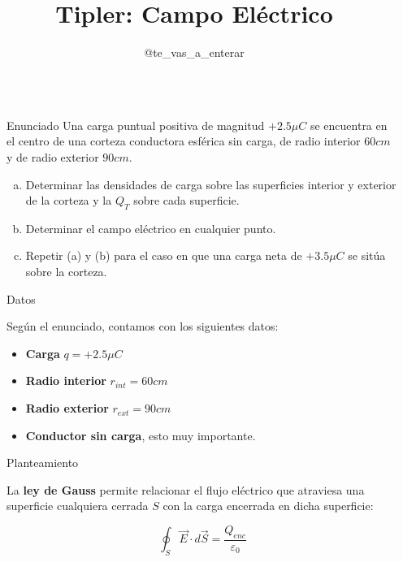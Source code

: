 \documentclass[final]{beamer}
\title{Tipler: Campo Eléctrico}
\author{@te\_vas\_a\_enterar}
\institute[shortinst]{Alberto de Santos}
\newlength{\sepwidth}
\newlength{\colwidth}
\newcommand{\separatorcolumn}{\begin{column}{\sepwidth}\end{column}}
\begin{document}
\begin{frame}[t]
\begin{columns}[t]
\separatorcolumn

\begin{column}{\colwidth}

  \begin{block}{Enunciado}
    Una carga puntual positiva de magnitud $+2.5 \mu C$ se encuentra en el centro de una corteza conductora esférica sin carga, 
        de radio interior $60cm$ y de radio exterior $90cm$.
    \begin{enumerate}[(a)]
        \item Determinar las densidades de carga sobre las superficies interior y exterior de la corteza y la $Q_T$ sobre cada superficie.
        \item Determinar el campo eléctrico en cualquier punto.
        \item Repetir (a) y (b) para el caso en que una carga neta de $+3.5 \mu C$ se sitúa sobre la corteza.
    \end{enumerate}

  \end{block}

  \begin{block}{Datos}

    Según el enunciado, contamos con los siguientes datos:

    \begin{itemize}
      \item \textbf{Carga} $q = +2.5 \mu C$
      \item \textbf{Radio interior} $r_{int} = 60cm$
      \item \textbf{Radio exterior} $r_{ext} = 90cm$
      \item \textbf{Conductor sin carga}, esto muy importante.
    \end{itemize}

  \end{block}

  \begin{alertblock}{Planteamiento}

    La \textbf{ley de Gauss} permite relacionar el flujo eléctrico que atraviesa una superficie cualquiera cerrada $S$ con la carga encerrada
    en dicha superficie:

    \begin{equation}
        \oint_S \vec{E} \cdot d\vec{S} = \frac{Q_{enc}}{\varepsilon_0}
        \label{eq:gauss}
    \end{equation}


\end{alertblock}
\end{column}
\end{columns}
\end{frame}
\end{document}
